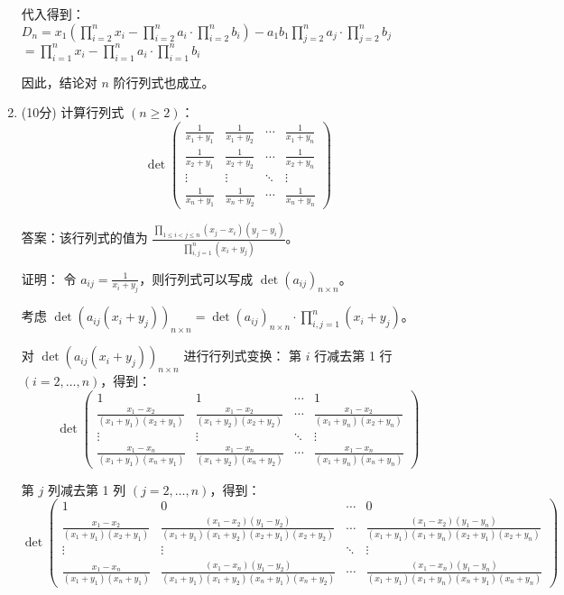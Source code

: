 \documentclass[a4paper,12pt]{article}
\begin{document}
\begin{enumerate}[leftmargin=*]
    代入得到：
    $D_n = x_1(\prod_{i=2}^n x_i - \prod_{i=2}^n a_i \cdot \prod_{i=2}^n b_i) - a_1b_1 \prod_{j=2}^n a_j \cdot \prod_{j=2}^n b_j$
    $    = \prod_{i=1}^n x_i - \prod_{i=1}^n a_i \cdot \prod_{i=1}^n b_i$
    
    因此，结论对 $n$ 阶行列式也成立。
    
    \item (10分) 计算行列式 $(n \geq 2)$：
    \[
    \det\begin{pmatrix}
    \frac{1}{x_1+y_1} & \frac{1}{x_1+y_2} & \cdots & \frac{1}{x_1+y_n} \\
    \frac{1}{x_2+y_1} & \frac{1}{x_2+y_2} & \cdots & \frac{1}{x_2+y_n} \\
    \vdots & \vdots & \ddots & \vdots \\
    \frac{1}{x_n+y_1} & \frac{1}{x_n+y_2} & \cdots & \frac{1}{x_n+y_n}
    \end{pmatrix}
    \]
    
    答案：该行列式的值为 $\frac{\prod_{1\leq i<j\leq n}(x_j-x_i)(y_j-y_i)}{\prod_{i,j=1}^n(x_i+y_j)}$。
    
    证明：
    令 $a_{ij} = \frac{1}{x_i+y_j}$，则行列式可以写成 $\det(a_{ij})_{n\times n}$。
    
    考虑 $\det(a_{ij}(x_i+y_j))_{n\times n} = \det(a_{ij})_{n\times n} \cdot \prod_{i,j=1}^n(x_i+y_j)$。
    
    对 $\det(a_{ij}(x_i+y_j))_{n\times n}$ 进行行列式变换：
    第 $i$ 行减去第 1 行 $(i=2,\ldots,n)$，得到：
    \[
    \det\begin{pmatrix}
    1 & 1 & \cdots & 1 \\
    \frac{x_1-x_2}{(x_1+y_1)(x_2+y_1)} & \frac{x_1-x_2}{(x_1+y_2)(x_2+y_2)} & \cdots & \frac{x_1-x_2}{(x_1+y_n)(x_2+y_n)} \\
    \vdots & \vdots & \ddots & \vdots \\
    \frac{x_1-x_n}{(x_1+y_1)(x_n+y_1)} & \frac{x_1-x_n}{(x_1+y_2)(x_n+y_2)} & \cdots & \frac{x_1-x_n}{(x_1+y_n)(x_n+y_n)}
    \end{pmatrix}
    \]
    
    第 $j$ 列减去第 1 列 $(j=2,\ldots,n)$，得到：
    \[
    \det\begin{pmatrix}
    1 & 0 & \cdots & 0 \\
    \frac{x_1-x_2}{(x_1+y_1)(x_2+y_1)} & \frac{(x_1-x_2)(y_1-y_2)}{(x_1+y_1)(x_1+y_2)(x_2+y_1)(x_2+y_2)} & \cdots & \frac{(x_1-x_2)(y_1-y_n)}{(x_1+y_1)(x_1+y_n)(x_2+y_1)(x_2+y_n)} \\
    \vdots & \vdots & \ddots & \vdots \\
    \frac{x_1-x_n}{(x_1+y_1)(x_n+y_1)} & \frac{(x_1-x_n)(y_1-y_2)}{(x_1+y_1)(x_1+y_2)(x_n+y_1)(x_n+y_2)} & \cdots & \frac{(x_1-x_n)(y_1-y_n)}{(x_1+y_1)(x_1+y_n)(x_n+y_1)(x_n+y_n)}
    \end{pmatrix}
    \]
    

\end{enumerate}
\end{document}
